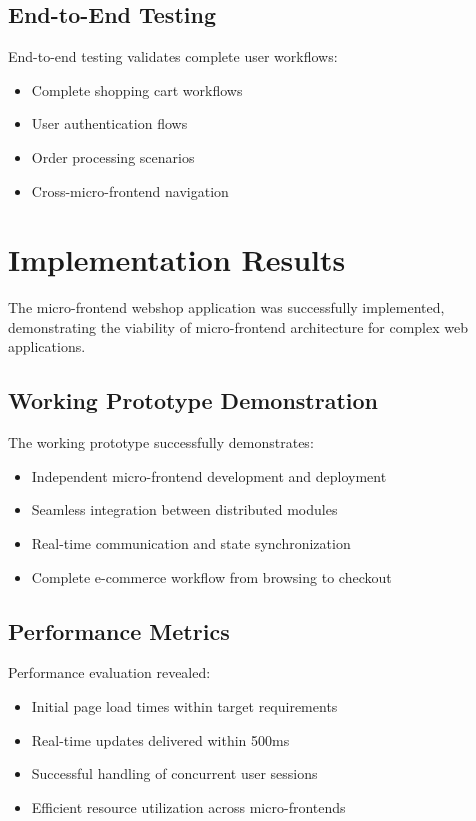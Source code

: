 \documentclass[12pt,a4paper]{report}
\begin{document}
\subsection{End-to-End Testing}

End-to-end testing validates complete user workflows:
\begin{itemize}
    \item Complete shopping cart workflows
    \item User authentication flows
    \item Order processing scenarios
    \item Cross-micro-frontend navigation
\end{itemize}

\section{Implementation Results}

The micro-frontend webshop application was successfully implemented, demonstrating the viability of micro-frontend architecture for complex web applications.

\subsection{Working Prototype Demonstration}

The working prototype successfully demonstrates:
\begin{itemize}
    \item Independent micro-frontend development and deployment
    \item Seamless integration between distributed modules
    \item Real-time communication and state synchronization
    \item Complete e-commerce workflow from browsing to checkout
\end{itemize}

\subsection{Performance Metrics}

Performance evaluation revealed:
\begin{itemize}
    \item Initial page load times within target requirements
    \item Real-time updates delivered within 500ms
    \item Successful handling of concurrent user sessions
    \item Efficient resource utilization across micro-frontends
\end{itemize}
\end{document}

